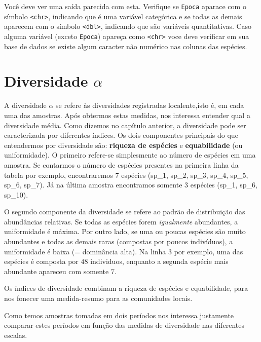 \documentclass[
]{book}
\begin{document}
Você deve ver uma saída parecida com esta. Verifique se \texttt{Epoca} aparace com o símbolo \texttt{\textless{}chr\textgreater{}}, indicando que é uma variável categórica e se todas as demais aparecem com o símbolo \texttt{\textless{}dbl\textgreater{}}, indicando que são variáveis quantitativas. Caso alguma variável (exceto \texttt{Epoca}) apareça como \texttt{\textless{}chr\textgreater{}} voce deve verificar em sua base de dados se existe algum caracter não numérico nas colunas das espécies.

\hypertarget{diversidade-alpha}{%
\section{\texorpdfstring{Diversidade \(\alpha\)}{Diversidade \textbackslash alpha}}\label{diversidade-alpha}}

A diversidade \(\alpha\) se refere às diversidades registradas localente,isto é, em cada uma das amostras. Após obtermos estas medidas, nos interessa entender qual a diversidade média. Como dizemos no capítulo anterior, a diversidade pode ser caracterizada por diferentes índices. Os dois componentes principais do que entendermos por diversidade são: \textbf{riqueza de espécies} e \textbf{equabilidade} (ou uniformidade). O primeiro refere-se simplesmente ao número de espécies em uma amostra. Se contarmos o número de espécies presentes na primeira linha da tabela por exemplo, encontraremos \(7\) espécies (sp\_1, sp\_2, sp\_3, sp\_4, sp\_5, sp\_6, sp\_7). Já na última amostra encontramos somente \(3\) espécies (sp\_1, sp\_6, sp\_10).

O segundo componente da diversidade se refere ao padrão de distribuição das abundâncias relativas. Se todas as espécies forem \emph{igualmente} abundantes, a uniformidade é máxima. Por outro lado, se uma ou poucas espécies são muito abundantes e todas as demais raras (compostas por poucos indivíduos), a uniformidade é baixa (= dominância alta). Na linha \(3\) por exemplo, uma das espécies é composta por \(48\) individuos, enquanto a segunda espécie mais abundante apareceu com somente \(7\).

Os índices de diversidade combinam a riqueza de espécies e equabilidade, para nos fonecer uma medida-resumo para as comunidades locais.

Como temos amostras tomadas em dois períodos nos interessa justamente comparar estes períodos em função das medidas de diversidade nas diferentes escalas.
\end{document}
